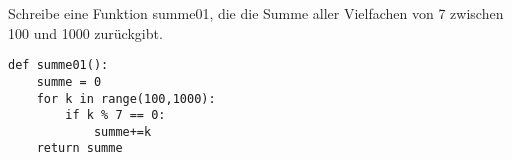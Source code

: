 \question[3] Schreibe eine Funktion summe01, die die Summe aller Vielfachen
von 7 zwischen 100 und 1000 zurückgibt.
\begin{solutionbox}{4cm}
\begin{lstlisting}
def summe01():
    summe = 0
    for k in range(100,1000):
        if k % 7 == 0:
            summe+=k
    return summe
\end{lstlisting}
\end{solutionbox}
